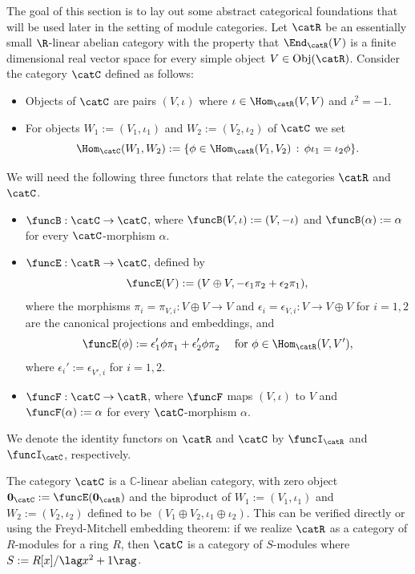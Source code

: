 \documentclass[12pt]{amsart}
\begin{document}
\label{sec:cat-gener}
The goal of this section is to lay out some abstract categorical foundations that will be used later in the setting of  module categories. Let $\catR$ be an essentially small $\R$-linear abelian category with the property  that $\End_{\catR}(V)$ is a finite dimensional real vector space for every simple object $V\in\mathrm{Obj}(\catR)$. 
 Consider the category $\catC$  defined as follows: 
\begin{itemize}
\item[(i)] Objects of $\catC$ are pairs $(V,\iota)$ where $\iota\in\Hom_{\catR}(V,V)$ and $\iota^2=-1$. 
\item[(ii)] For objects $W_1:=(V_1,\iota_1)$ and $W_2:=(V_2,\iota_2)$ of $\catC$ we set
\[
\Hom_{\catC}(W_1,W_2):=\{\phi\in\Hom_{\catR}(V_1,V_2)\,:\,\phi\iota_1=\iota_2\phi\}.
\] 
\end{itemize}
We will need the following three functors that relate the categories $\catR$ and $\catC$.
\begin{itemize}

\item[(i)]$\funcB:\catC\to\catC$, where $\funcB(V,\iota):=(V,-\iota)$ and  $\funcB(\alpha):=\alpha$ for every $\catC$-morphism $\alpha$.

\item[(ii)]  $\funcE:\catR\to\catC$, defined by 
\[
\funcE(V):=(V\oplus V,-\epsilon_{1}\pi_{2}+ \epsilon_{2}\pi_{1})
,\]
where the morphisms $\pi_i=\pi_{V,i}:V\oplus V\to V$ 
and 
 $\epsilon_i=\epsilon_{V,i}:V\to V\oplus V$ for $i=1,2$ are 
the canonical projections and embeddings, and  \[
\funcE(\phi):=\epsilon'_{1}\phi\pi_{1}^{}+ \epsilon'_{2}\phi\pi_{2}^{}
\quad\text{ for }\phi\in\Hom_{\catR}(V,V'),
\]  
where $\epsilon_i':=\epsilon_{V',i}^{}$ for $i=1,2$.  

\item[(iii)] $\funcF:\catC\to\catR$, where $\funcF$ maps $(V,\iota)$ to $V$ and  $\funcF(\alpha):=\alpha$ for every $\catC$-morphism $\alpha$.


\end{itemize}
We denote the identity functors on $\catR$ and $\catC$ by $\funcI_\catR$ and $\funcI_\catC$, respectively.

The category $\catC$ is a $\mathbb C$-linear abelian category,
with zero object $\mathbf{0}_{\catC}:=\funcE(\mathbf{0}_{\catR})$
and the biproduct of   $W_1:=(V_1,\iota_1)$ and $W_2:=(V_2,\iota_2)$ defined to be $(V_1\oplus V_2,\iota_1\oplus \iota_2)$.
This can be verified directly 
or using the 
Freyd-Mitchell embedding theorem:
if we realize $\catR$ as a  category of $R$-modules for a ring $R$, then  $\catC$ is  a  category of $S$-modules where $S:=R[x]/\lag x^2+1\rag$.  
\end{document}
